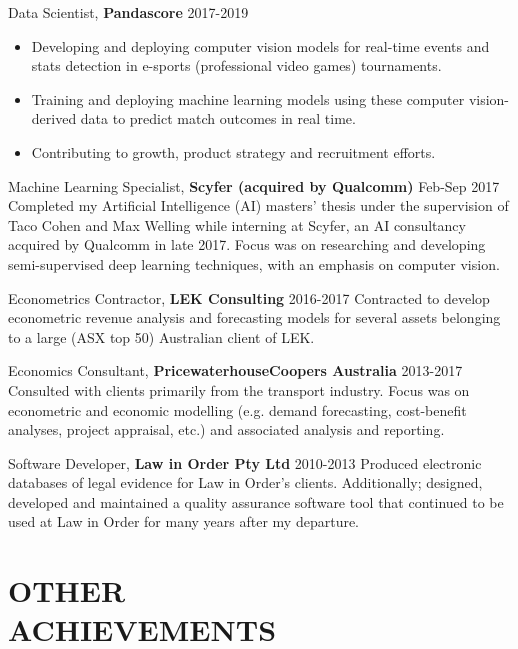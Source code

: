 \documentclass[margin]{res}
\begin{document}
\begin{resume}
		{Data Scientist,} {\bf Pandascore} \hfill 2017-2019
		\vspace{1mm}
		\begin{itemize}
			\item Developing and deploying computer vision models for real-time events and stats detection in e-sports (professional video games) tournaments.
			\item Training and deploying machine learning models using these computer vision-derived data to predict match outcomes in real time.
			\item Contributing to growth, product strategy and recruitment efforts.
		\end{itemize}
		
		{Machine Learning Specialist,} {\bf Scyfer (acquired by Qualcomm)} \hfill Feb-Sep 2017\vspace{1mm}\newline
		Completed my Artificial Intelligence (AI) masters' thesis under the supervision of Taco Cohen and Max Welling while interning at Scyfer, an AI consultancy acquired by Qualcomm in late 2017. Focus was on researching and developing semi-supervised deep learning techniques, with an emphasis on computer vision.
		
		{Econometrics Contractor,} {\bf LEK Consulting} \hfill 2016-2017\vspace{1mm}\newline
		Contracted to develop econometric revenue analysis and forecasting models for several assets belonging to a large (ASX top 50) Australian client of LEK.
		
		{Economics Consultant,} {\bf PricewaterhouseCoopers Australia} \hfill 2013-2017\vspace{1mm}\newline
		Consulted with clients primarily from the transport industry. Focus was on econometric and economic modelling (e.g. demand forecasting, cost-benefit analyses, project appraisal, etc.) and associated analysis and reporting.
		
		{Software Developer,} {\bf Law in Order Pty Ltd} \hfill 2010-2013\vspace{1mm}\newline
		Produced electronic databases of legal evidence for Law in Order's clients. Additionally; designed, developed and maintained a quality assurance software tool that continued to be used at Law in Order for many years after my departure.
		
		
		\section{OTHER \\ ACHIEVEMENTS}
		

\end{resume}
\end{document}
